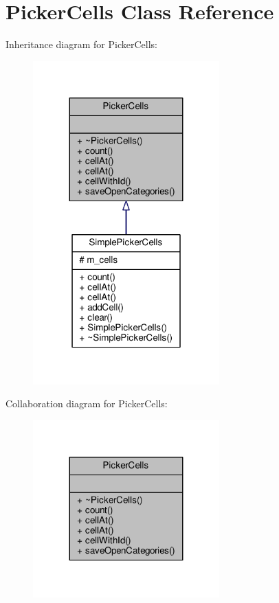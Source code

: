 \hypertarget{classPickerCells}{}\section{Picker\+Cells Class Reference}
\label{classPickerCells}


Inheritance diagram for Picker\+Cells\+:
\nopagebreak
\begin{figure}[H]
\begin{center}
\leavevmode
\includegraphics[width=203pt]{d8/d83/classPickerCells__inherit__graph}
\end{center}
\end{figure}


Collaboration diagram for Picker\+Cells\+:
\nopagebreak
\begin{figure}[H]
\begin{center}
\leavevmode
\includegraphics[width=203pt]{d6/d23/classPickerCells__coll__graph}
\end{center}
\end{figure}
